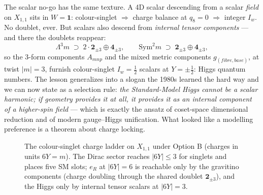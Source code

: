 \documentclass[11pt]{article}
\newcommand{\X}{X_{1,1}}
\newcommand{\Iw}{I_w}
\begin{document}
The scalar no-go has the same texture. A 4D scalar descending from a scalar \emph{field} on
$\X$ sits in $W=\mathbf 1$: colour-singlet $\Rightarrow$ charge balance at $q_8=0$
$\Rightarrow$ integer $\Iw$. No doublet, ever. But scalars also descend from \emph{internal
tensor components} --- and there the doublets reappear:
\[
\Lambda^3 m \;\supset\; 2\cdot \mathbf 2_{\pm3}\oplus\mathbf 4_{\pm3}, \qquad
\mathrm{Sym}^2 m \;\supset\; \mathbf 2_{\pm3}\oplus\mathbf 4_{\pm3},
\]
so the 3-form components $A_{mnp}$ and the mixed metric components $g_{(fibre,base)}$, at
twist $|m|=3$, furnish colour-singlet $\Iw=\tfrac12$ scalars at $Y=\pm\tfrac12$: Higgs
quantum numbers. The lesson generalizes into a slogan the 1980s learned the hard way and we
can now state as a selection rule: \emph{the Standard-Model Higgs cannot be a scalar
harmonic; if geometry provides it at all, it provides it as an internal component of a
higher-spin field} --- which is exactly the ansatz of coset-space dimensional reduction and
of modern gauge--Higgs unification. What looked like a modelling preference is a theorem
about charge locking.

\begin{figure}[t]
\centering
{}
\caption{The colour-singlet charge ladder on $\X$ under Option B (charges in units
$6Y=m$). The Dirac sector reaches $|6Y|\le 3$ for singlets and places five SM slots; $e_R$
at $|6Y|=6$ is reachable only by the gravitino components (charge doubling through the
shared doublet $\mathbf 2_{\pm3}$), and the Higgs only by internal tensor scalars at
$|6Y|=3$.}
\label{fig:slots}
\end{figure}
\end{document}
